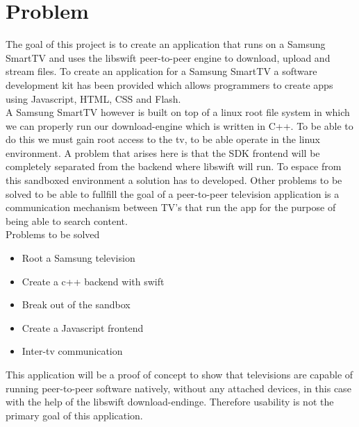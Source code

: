 \chapter{Problem}

The goal of this project is to create an application that runs on a Samsung SmartTV and uses the libswift peer-to-peer engine to download, upload and stream files. To create an application for a Samsung SmartTV a software development kit has been provided which allows programmers to create apps using Javascript, HTML, CSS and Flash.\\
A Samsung SmartTV however is built on top of a linux root file system in which we can properly run our download-engine which is written in C++. To be able to do this we must gain root access to the tv, to be able operate in the linux environment. A problem that arises here is that the SDK frontend will be completely separated from the backend where libswift will run. To espace from this sandboxed environment a solution has to developed. Other problems to be solved to be able to fullfill the goal of a peer-to-peer television application is a communication mechanism between TV's that run the app for the purpose of being able to search content.\\

Problems to be solved
\begin{itemize}
\item Root a Samsung television
\item Create a c++ backend with swift
\item Break out of the sandbox
\item Create a Javascript frontend
\item Inter-tv communication
\end{itemize}

This application will be a proof of concept to show that televisions are capable of running peer-to-peer software natively, without any attached devices, in this case with the help of the libswift download-endinge. Therefore usability is not the primary goal of this application.

